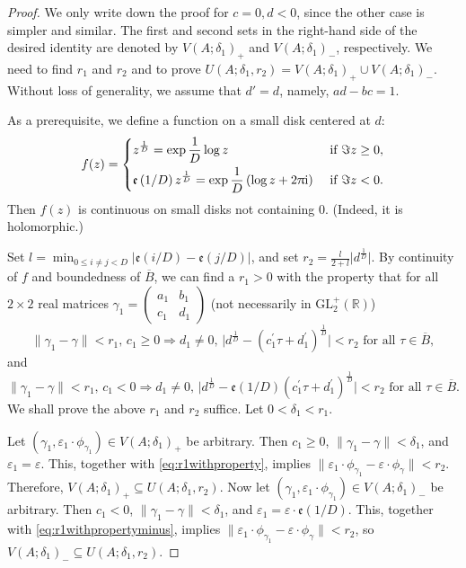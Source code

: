 \documentclass[10pt,a4paper]{amsart}
\newcommand*\abs[1]{\lvert#1\rvert}
\newcommand\etp[1]{\mathfrak{e}\left(#1\right)}
\newcommand\glpR{\mathrm{GL}_2^{+}(\mathbb{R})}
\newcommand\rmi{\mathrm{i}}
\newcommand\tbtmat[4]{\left(\begin{smallmatrix}{#1} & {#2} \\ {#3} & {#4}\end{smallmatrix}\right)}
\begin{document}
\begin{proof}
We only write down the proof for $c=0,d<0$, since the other case is simpler and similar. The first and second sets in the right-hand side of the desired identity are denoted by $V(A;\delta_1)_{+}$ and $V(A;\delta_1)_{-}$, respectively. We need to find $r_1$ and $r_2$ and to prove $U(A;\delta_1,r_2)=V(A;\delta_1)_{+}\cup V(A;\delta_1)_{-}$. Without loss of generality, we assume that $d'=d$, namely, $ad-bc=1$.

As a prerequisite, we define a function on a small disk centered at $d$:
\begin{equation*}
f(z)=\begin{dcases}
z^{\frac{1}{D}}=\exp\frac{1}{D}\log z &\text{ if }\Im z\geq0,\\
\etp{1/D}z^{\frac{1}{D}}=\exp\frac{1}{D}\left(\log z+2\uppi\rmi\right) &\text{ if }\Im z<0.
\end{dcases}
\end{equation*}
Then $f(z)$ is continuous on small disks not containing $0$. (Indeed, it is holomorphic.)

Set $l=\min_{0\leq i\neq j<D}\abs{\etp{i/D}-\etp{j/D}}$, and set $r_2=\frac{l}{2+l}\abs{d^{\frac{1}{D}}}$. By continuity of $f$ and boundedness of $\overline{B}$, we can find a $r_1>0$ with the property that for all $2\times2$ real matrices $\gamma_1=\tbtmat{a_1}{b_1}{c_1}{d_1}$ (not necessarily in $\glpR$)
\begin{equation}
\label{eq:r1withproperty}
\lVert\gamma_1-\gamma\rVert<r_1,\,c_1\geq0\Longrightarrow d_1\neq0,\,\abs{d^{\frac{1}{D}}-(c_1^\prime\tau+d_1^\prime)^{\frac{1}{D}}}<r_2\text{ for all }\tau\in\overline{B},
\end{equation}
and
\begin{equation}
\label{eq:r1withpropertyminus}
\lVert\gamma_1-\gamma\rVert<r_1,\,c_1<0\Longrightarrow d_1\neq0,\,\abs{d^{\frac{1}{D}}-\etp{1/D}(c_1^\prime\tau+d_1^\prime)^{\frac{1}{D}}}<r_2\text{ for all }\tau\in\overline{B}.
\end{equation}
We shall prove the above $r_1$ and $r_2$ suffice. Let $0<\delta_1<r_1$.

Let $(\gamma_1,\varepsilon_1\cdot\phi_{\gamma_1})\in V(A;\delta_1)_{+}$ be arbitrary. Then $c_1\geq0$, $\lVert\gamma_1-\gamma\rVert<\delta_1$, and $\varepsilon_1=\varepsilon$. This, together with \eqref{eq:r1withproperty}, implies $\lVert\varepsilon_1\cdot\phi_{\gamma_1}-\varepsilon\cdot\phi_{\gamma}\rVert<r_2$. Therefore, $V(A;\delta_1)_{+}\subseteq U(A;\delta_1,r_2)$. Now let $(\gamma_1,\varepsilon_1\cdot\phi_{\gamma_1})\in V(A;\delta_1)_{-}$ be arbitrary. Then $c_1<0$, $\lVert\gamma_1-\gamma\rVert<\delta_1$, and $\varepsilon_1=\varepsilon\cdot\etp{1/D}$. This, together with \eqref{eq:r1withpropertyminus}, implies $\lVert\varepsilon_1\cdot\phi_{\gamma_1}-\varepsilon\cdot\phi_{\gamma}\rVert<r_2$, so $V(A;\delta_1)_{-}\subseteq U(A;\delta_1,r_2)$.


\end{proof}
\end{document}
